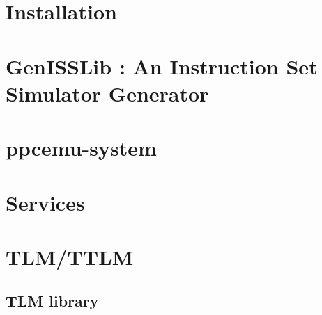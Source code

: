 \documentclass[a4paper,11pt,onecolumn]{mathese}
\begin{document}
\setlength{\parskip}{0.5em}%
\baselineskip 14pt

%


\frontmatter
%
%

\tableofcontents {}
\listoffigures

\mainmatter

\chapter{Installation}
\label{installation}


\chapter{GenISSLib : An Instruction Set Simulator Generator}
\label{genisslib}


\chapter{ppcemu-system}
\label{ppcemu_system}


\chapter{Services}
\label{services}


\chapter{TLM/TTLM}
\label{tlm_ttlm}


\begin{appendix}
\chapter{TLM library}
\label{tlm_appendix}


\end{appendix}

% 
%  

%
%
\end{document}
